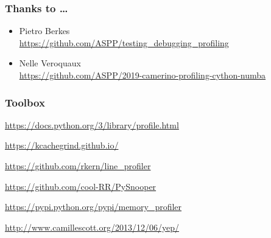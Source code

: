 \documentclass[serif]{beamer}
\begin{document}
\begin{frame}[fragile]
  \frametitle{Thanks to …}

  \begin{itemize}
  \item Pietro Berkes\\
    {\small \url{https://github.com/ASPP/testing_debugging_profiling}}
  \item Nelle Veroquaux\\
    {\small \url{https://github.com/ASPP/2019-camerino-profiling-cython-numba}}
  \end{itemize}
\end{frame}

\begin{frame}
  \frametitle{Toolbox}

  \url{https://docs.python.org/3/library/profile.html}

  \url{https://kcachegrind.github.io/}

  \url{https://github.com/rkern/line_profiler}

  \url{https://github.com/cool-RR/PySnooper}

  \url{https://pypi.python.org/pypi/memory_profiler}

  \url{http://www.camillescott.org/2013/12/06/yep/}
\end{frame}
\end{document}
